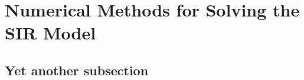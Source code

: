\section{Numerical Methods for Solving the SIR Model}\label{Numerical_Methods}\thispagestyle{SectionFirstPage} %
\subsection{Yet another subsection}\label{multicollinearity}



